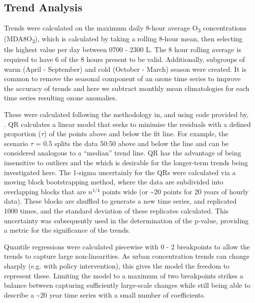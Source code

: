 \documentclass[journal abbreviation, manuscript]{copernicus}
\begin{document}
\subsection{Trend Analysis}

Trends were calculated on the maximum daily 8-hour average O\textsubscript{3} concentrations (MDA8O\textsubscript{3}), which is calculated by taking a rolling 8-hour mean, then selecting the highest value per day between 0700 - 2300 L. The 8 hour rolling average is required to have 6 of the 8 hours present to be valid. Additionally, subgroups of warm (April - September) and cold (October - March) season were created. It is common to remove the seasonal component of an ozone time series to improve the accuracy of trends \citep{cooper_2020} and here we subtract monthly mean climatologies for each time series resulting ozone anomalies. 

These were calculated following the methodology in, and using code provided by, \cite{chang2023guidancenotebeststatistical}. QR calculates a linear model that seeks to minimise the residuals with a defined proportion ($\tau$) of the points above and below the fit line. For example, the scenario $\tau$ = 0.5 splits the data 50:50 above and below the line and can be considered analogous to a “median” trend line. QR has the advantage of being insensitive to outliers and the which is desirable for the longer-term trends being investigated here. The 1-sigma uncertainly for the QRs were calculated via a moving block bootstrapping method, where the data are subdivided into overlapping blocks that are $n^{1/4}$ points wide (or \textasciitilde{20} points for 20 years of hourly data). These blocks are shuffled to generate a new time series, and replicated 1000 times, and the standard deviation of these replicates calculated. This uncertainty was subsequently used in the determination of the p-value, providing a metric for the significance of the trends. 

Quantile regressions were calculated piecewise with 0 - 2 breakpoints to allow the trends to capture large non-linearities. As urban concentration trends can change sharply (e.g. with policy intervention), this gives the model the freedom to represent these. Limiting the model to a maximum of two breakpoints strikes a balance between capturing sufficiently large-scale changes while still being able to describe a \textasciitilde{20} year time series with a small number of coefficients.
\end{document}
